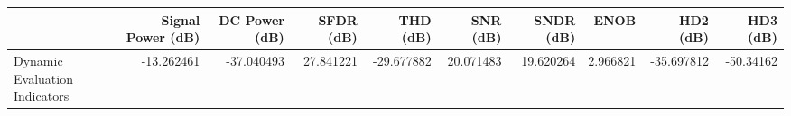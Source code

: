 \begin{tabular}{lrrrrrrrrr}
\toprule
{} &  Signal Power (dB) &  DC Power (dB) &  SFDR (dB) &   THD (dB) &   SNR (dB) &  SNDR (dB) &      ENOB &   HD2 (dB) &  HD3 (dB) \\
\midrule
Dynamic Evaluation Indicators &         -13.262461 &     -37.040493 &  27.841221 & -29.677882 &  20.071483 &  19.620264 &  2.966821 & -35.697812 & -50.34162 \\
\bottomrule
\end{tabular}
